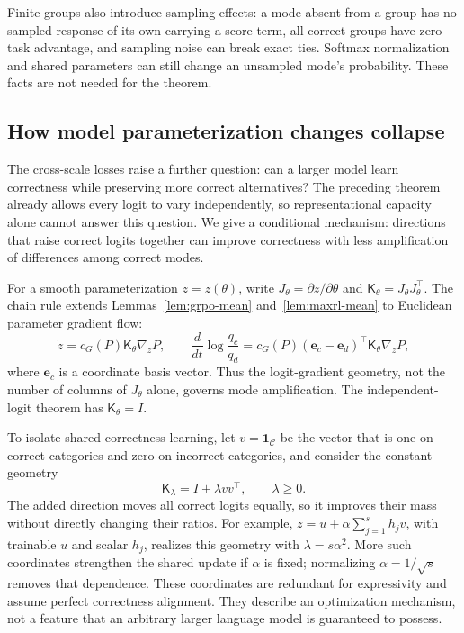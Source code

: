 \documentclass{article}
\newcommand{\1}{\mathbf 1}
\theoremstyle{remark}
\theoremstyle{definition}
\theoremstyle{plain}
\begin{document}
Finite groups also introduce sampling effects: a mode absent from
a group has no sampled response of its own carrying a score term,
all-correct groups have zero task advantage, and sampling noise can break exact
ties. Softmax normalization and shared parameters can still change an
unsampled mode's probability. These facts are not needed for
the theorem.

\subsection{How model parameterization changes collapse}
\label{app:theory-size}

The cross-scale losses raise a further question: can a larger model learn
correctness while preserving more correct alternatives? The preceding theorem
already allows every logit to vary independently, so representational capacity
alone cannot answer this question. We give a conditional mechanism: directions
that raise correct logits together can improve correctness with less
amplification of differences among correct modes.

For a smooth parameterization $z=z(\theta)$, write
$J_\theta=\partial z/\partial\theta$ and
$\mathsf K_\theta=J_\theta J_\theta^\top$. The chain rule extends
Lemmas~\ref{lem:grpo-mean} and~\ref{lem:maxrl-mean} to Euclidean parameter
gradient flow:
\begin{equation}
 \dot z=c_G(P)\mathsf K_\theta\nabla_zP,
 \qquad
 \frac{d}{dt}\log\frac{q_c}{q_d}
 =c_G(P)(\mathbf e_c-\mathbf e_d)^\top\mathsf K_\theta\nabla_zP,
 \label{eq:parameterized-collapse}
\end{equation}
where $\mathbf e_c$ is a coordinate basis vector. Thus the logit-gradient geometry,
not the number of columns of $J_\theta$ alone, governs mode amplification.
The independent-logit theorem has $\mathsf K_\theta=I$.

To isolate shared correctness learning, let $v=\1_{\mathcal C}$ be the
vector that is one on correct categories and zero on incorrect categories,
and consider the constant geometry
\begin{equation}
 \mathsf K_\lambda=I+\lambda vv^\top,\qquad \lambda\ge0.
 \label{eq:shared-correctness-kernel}
\end{equation}
The added direction moves all correct logits equally, so it improves their
mass without directly changing their ratios. For example,
$z=u+\alpha\sum_{j=1}^s h_jv$, with trainable $u$ and scalar $h_j$, realizes
this geometry with $\lambda=s\alpha^2$. More such coordinates strengthen the
shared update if $\alpha$ is fixed; normalizing $\alpha=1/\sqrt{s}$ removes
that dependence. These coordinates are redundant for expressivity and assume
perfect correctness alignment. They describe an optimization mechanism, not
a feature that an arbitrary larger language model is guaranteed to possess.
\end{document}
